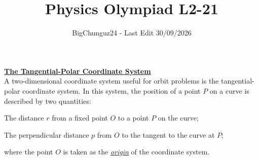 \documentclass[a4paper]{article}
\title{\Huge Physics Olympiad L2-21}
\author{BigChunguz24 - Last Edit 30/09/2026}
\date{}
\begin{document}
	\maketitle
	
	\vspace{-1em}
	\Problem
	\textbf{\underline{The Tangential-Polar Coordinate System}}
	\\
	A two-dimensional coordinate system useful for orbit problems is the tangential-polar coordinate system. In this system, the position of a point $P$ on a curve is described by two quantities:
	\begin{description}[leftmargin=!, labelwidth=\widthof{$\rightarrow$}]
		\item[$\rightarrow$] The distance $r$ from a fixed point $O$ to a point $P$ on the curve;
		\item[$\rightarrow$] The perpendicular distance $p$ from $O$ to the tangent to the curve at $P$;
	\end{description}
	where the point $O$ is taken as the \emph{\underline{origin}} of the coordinate system.
	
\end{document}
